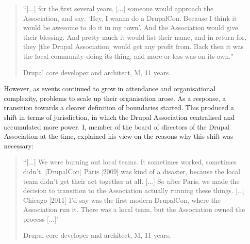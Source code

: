 \begin{quotation}
``[...] for the first several years, [...] someone would approach the Association, and say: `Hey, I wanna do a DrupalCon. Because I think it would be awesome to do it in my town'. And the Association would give their blessing. And pretty much it would list their name, and in return for, they [the Drupal Association] would get any profit from. Back then it was the local community doing its thing, and more or less was on its own."

\begin{flushright}\footnotesize{Drupal core developer and architect, M, 11 years.}\end{flushright}
\end{quotation}

However, as events continued to grow in attendance and organisational complexity, problems to scale up their organisation arose. As a response, a transition towards a clearer definition of boundaries started. This produced a shift in terms of jurisdiction, in which the Drupal Association centralised and accumulated more power. I, member of the board of directors of the Drupal Association at the time, explained his view on the reasons why this shift was necessary:

\begin{quotation}
``[...] We were burning out local teams. It sometimes worked, sometimes didn't. [DrupalCon] Paris [2009] was kind of a disaster, because the local team didn't get their act together at all. [...] So after Paris, we made the decision to transition to the Association actually running these things. [...] Chicago [2011] I'd say was the first modern DrupalCon, where the Association run it. There was a local team, but the Association owned the process [...]"

\begin{flushright}\footnotesize{Drupal core developer and architect, M, 11 years.}\end{flushright}
\end{quotation}

